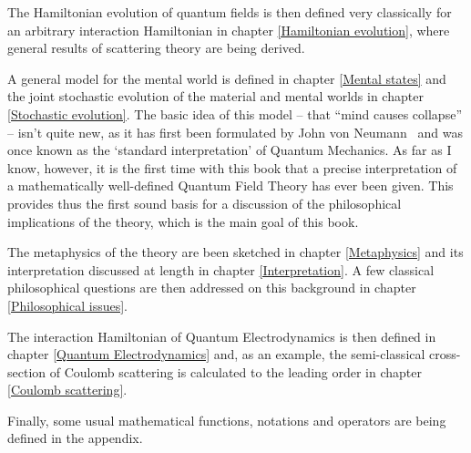 The Hamiltonian evolution of quantum fields is then defined very classically for an arbitrary interaction Hamiltonian in chapter \ref{Hamiltonian evolution}, where general results of scattering theory are being derived.

A general model for the mental world is defined in chapter \ref{Mental states} and the joint stochastic evolution of the material and mental worlds in chapter \ref{Stochastic evolution}.
The basic idea of this model -- that ``mind causes collapse'' -- isn't quite new, as it has first been formulated by John von Neumann~\cite{Neumann1932} and was once known as the `standard interpretation' of Quantum Mechanics.
As far as I know, however, it is the first time with this book that a precise interpretation of a mathematically well-defined Quantum Field Theory has ever been given.
This provides thus the first sound basis for a discussion of the philosophical implications of the theory, which is the main goal of this book.

The metaphysics of the theory are been sketched in chapter \ref{Metaphysics} and its interpretation discussed at length in chapter \ref{Interpretation}.
A few classical philosophical questions are then addressed on this background in chapter \ref{Philosophical issues}.

The interaction Hamiltonian of Quantum  Electrodynamics is then defined in chapter \ref{Quantum Electrodynamics} and, as an example, the semi-classical cross-section of Coulomb scattering is calculated to the leading order in chapter \ref{Coulomb scattering}.

Finally, some usual mathematical functions, notations and operators are being defined in the appendix.
